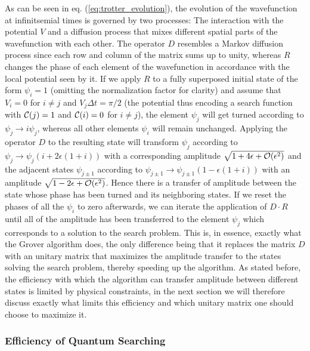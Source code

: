 \smallskip

As can be seen in eq. (\ref{eq:trotter_evolution}), the evolution of the wavefunction at infinitsemial times is governed by two processes: The interaction with the potential $V$ and a diffusion process that mixes different spatial parts of the wavefunction with each other. The operator $D$ resembles a Markov diffusion process since each row and column of the matrix sums up to unity, whereas $R$ changes the phase of each element of the wavefunction in accordance with the local potential seen by it. If we apply $R$ to a fully superposed initial state of the form $\psi_i = 1$ (omitting the normalization factor for clarity) and assume that $V_i = 0$ for $i \ne j$ and $V_j \Delta t = \pi/2$ (the potential thus encoding a search function with $\Or(j)=1$ and $\Or(i)=0$ for $i\ne j$), the element $\psi_j$ will get turned according to $\psi_j \to i\psi_j $, whereas all other elements $\psi_i$ will remain unchanged. Applying the operator $D$ to the resulting state will transform $\psi_j$ according to $\psi_j \to \psi_j(i+2\epsilon(1+i))$ with a corresponding amplitude $\sqrt{1+4\epsilon+\begin{mathcal}O\end{mathcal}(\epsilon^2)}$ and the adjacent states $\psi_{j\pm 1}$ according to $\psi_{j\pm 1} \to \psi_{j\pm 1}(1-\epsilon(1+i))$ with an amplitude $\sqrt{1-2\epsilon +\begin{mathcal}O\end{mathcal}(\epsilon^2)}$. Hence there is a transfer of amplitude between the state whose phase has been turned and its neighboring states. If we reset the phases of all the $\psi_i$ to zero afterwards, we can iterate the application of $D\cdot R$ until all of the amplitude has been transferred to the element $\psi_j$ which corresponds to a solution to the search problem. This is, in essence, exactly what the Grover algorithm does, the only difference being that it replaces the matrix $D$ with an unitary matrix that maximizes the amplitude transfer to the states solving the search problem, thereby speeding up the algorithm. As stated before, the efficiency with which the algorithm can transfer amplitude between different states is limited by physical constraints, in the next section we will therefore discuss exactly what limits this efficiency and which unitary matrix one should choose to maximize it.

\subsubsection{Efficiency of Quantum Searching}

